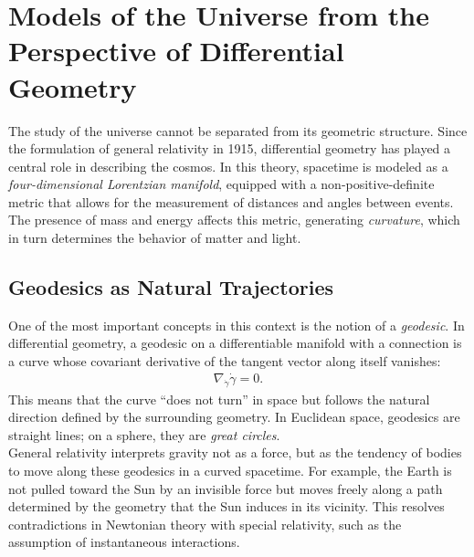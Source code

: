 \documentclass{aleph-revista}
\begin{document}
\section{Models of the Universe from the Perspective of Differential Geometry}
The study of the universe cannot be separated from its geometric structure. Since the formulation of general relativity in 1915, differential geometry has played a central role in describing the cosmos. In this theory, spacetime is modeled as a \textit{four-dimensional Lorentzian manifold}, equipped with a non-positive-definite metric that allows for the measurement of distances and angles between events. The presence of mass and energy affects this metric, generating \textit{curvature}, which in turn determines the behavior of matter and light.
\subsection*{Geodesics as Natural Trajectories}
One of the most important concepts in this context is the notion of a \textit{geodesic}. In differential geometry, a geodesic on a differentiable manifold with a connection is a curve whose covariant derivative of the tangent vector along itself vanishes:\\
\begin{align*}
\nabla_{\dot{\gamma}} \dot{\gamma} = 0.
\end{align*}
This means that the curve “does not turn” in space but follows the natural direction defined by the surrounding geometry. In Euclidean space, geodesics are straight lines; on a sphere, they are \textit{great circles}.\\
General relativity interprets gravity not as a force, but as the tendency of bodies to move along these geodesics in a curved spacetime. For example, the Earth is not pulled toward the Sun by an invisible force but moves freely along a path determined by the geometry that the Sun induces in its vicinity. This resolves contradictions in Newtonian theory with special relativity, such as the assumption of instantaneous interactions.
\end{document}
